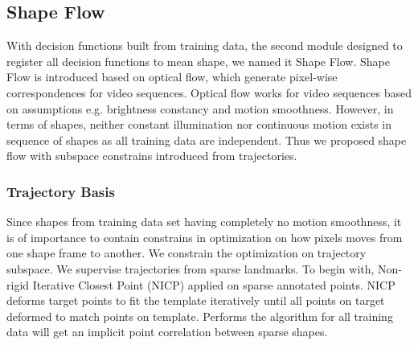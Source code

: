 

\subsection{Shape Flow}

With decision functions built from training data, the second module designed to register all decision functions to mean shape, we named it Shape Flow. Shape Flow is introduced based on optical flow, which generate pixel-wise correspondences for video sequences. Optical flow works for video sequences based on assumptions e.g. brightness constancy and motion smoothness. However, in terms of shapes, neither constant illumination nor continuous motion exists in sequence of shapes as all training data are independent. Thus we proposed shape flow with subspace constrains introduced from trajectories.

\subsubsection{Trajectory Basis} \label{sec:trabasis}
Since shapes from training data set having completely no motion smoothness, it is of importance to contain constrains in optimization on how pixels moves from one shape frame to another. We constrain the optimization on trajectory subspace.
We supervise trajectories from sparse landmarks. To begin with, Non-rigid Iterative Closest Point (NICP)\cite{?} applied on sparse annotated points. NICP deforms target points to fit the template iteratively until all points on target deformed to match points on template. Performs the algorithm for all training data will get an implicit point correlation between sparse shapes.

